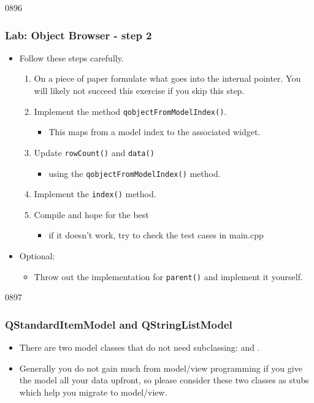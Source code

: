\begin{slide}{0896}\frametitle{Lab: Object Browser - step 2}
\label{model_view_exercise_step2}
\begin{itemize}
\item Follow these steps carefully.
  \begin{enumerate}
  \item On a piece of paper formulate what goes into the internal
    pointer. You will likely not succeed this exercise if you skip this
    step.
  \item Implement the method \texttt{qobjectFromModelIndex()}.
    \begin{itemize}
    \item This maps from a model index to the associated widget.
    \end{itemize}
  \item Update \texttt{rowCount()} and
    \texttt{data()}
    \begin{itemize}
    \item using the \texttt{qobjectFromModelIndex()} method.
    \end{itemize}
  \item Implement the \texttt{index()} method.
  \item Compile and hope for the best
    \begin{itemize}
    \item if it doesn't work, try to check the
      test cases in main.cpp
    \end{itemize}
  \end{enumerate}
\item Optional:
  \begin{itemize}
  \item Throw out the implementation for \texttt{parent()}
    and implement it yourself.
  \end{itemize}
\end{itemize}
\end{slide}

\begin{slide}[fragile]{0897}\frametitle{QStandardItemModel and QStringListModel}
\begin{itemize}
\item There are two model classes that do not need subclassing:
   and .
\item Generally you do not gain much from model/view programming if you
  give the model all your data upfront, so please consider these two
  classes as stubs which help you migrate to model/view.
\end{itemize}
\end{slide}

